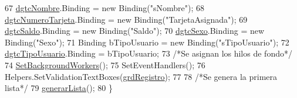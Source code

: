 \begin{DoxyCode}
67             \hyperlink{class_proyecto___integrador__3_1_1_main_window_a867d58258d7e2baa1b4d446dda2f2c51}{dgtcNombre}.Binding = \textcolor{keyword}{new} Binding(\textcolor{stringliteral}{"sNombre"});
68             \hyperlink{class_proyecto___integrador__3_1_1_main_window_ab28b60d43c765aa3cf2dc7c64e56f8c7}{dgtcNumeroTarjeta}.Binding = \textcolor{keyword}{new} Binding(\textcolor{stringliteral}{"TarjetaAsignada"});
69             \hyperlink{class_proyecto___integrador__3_1_1_main_window_a4ebf6bc961d2d0fab8efaa8e3ea2879c}{dgtcSaldo}.Binding = \textcolor{keyword}{new} Binding(\textcolor{stringliteral}{"Saldo"});
70             \hyperlink{class_proyecto___integrador__3_1_1_main_window_a62ea2abb05ef20cbb64ebc690ca3011d}{dgtcSexo}.Binding = \textcolor{keyword}{new} Binding(\textcolor{stringliteral}{"Sexo"});
71             Binding bTipoUsuario = \textcolor{keyword}{new} Binding(\textcolor{stringliteral}{"sTipoUsuario"});
72             \hyperlink{class_proyecto___integrador__3_1_1_main_window_a7760fc254a46e1c3b276f91e25f17a6a}{dgtcTipoUsuario}.Binding = bTipoUsuario;
73             \textcolor{comment}{/*Se asignan los hilos de fondo*/}
74             \hyperlink{class_proyecto___integrador__3_1_1_main_window_a1d3507f367b67fc0d78b419104022d8b}{SetBackgroundWorkers}();
75             SetEventHandlers();
76             Helpers.SetValidationTextBoxes(\hyperlink{class_proyecto___integrador__3_1_1_main_window_a9386928aff943060071efe864b17ca03}{grdRegistro});
77             
78             \textcolor{comment}{/*Se genera la primera lista*/}
79             \hyperlink{class_proyecto___integrador__3_1_1_main_window_a524b3904582404e525a70f8ceac96e7d}{generarLista}();
80         \}
\end{DoxyCode}


